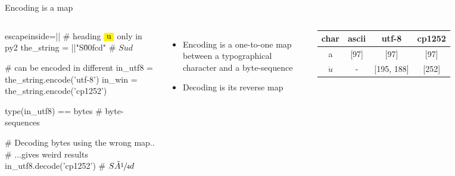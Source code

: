 \begin{pyframe}{Encoding is a map}
\begin{columns}


\begin{pycode*}{escapeinside=||}
# heading $\pyver{u}$ only in py2
the_string = ||"S\u00fcd" # $S\ddot{u}d$

# can be encoded in different
in_utf8 =  the_string.encode('utf-8')
in_win = the_string.encode('cp1252')

type(in_utf8) == bytes # byte-sequences

# Decoding bytes using the wrong map..
# ...gives weird results
in_utf8.decode('cp1252') # $S\tilde{A}\sfrac{1}{4}d$





\end{pycode*}

\begin{itemize}
\item Encoding is a one-to-one map between a typographical character and a byte-sequence 
\item Decoding is its reverse map
\end{itemize}

\small
\begin{tabular}{|c||c|c|c|}\hline 
char        & ascii     & utf-8         & cp1252     \\ \hline
a           & [97]      & [97]          & [97]      \\ \hline     
$\ddot{u}$  & -         & [195, 188]    & [252]              \\ \hline
\end{tabular}
\end{columns}

\end{pyframe}




